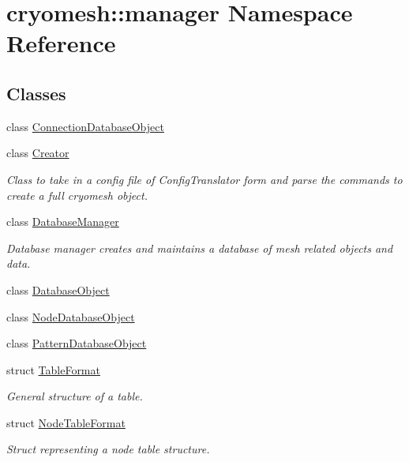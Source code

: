 \hypertarget{namespacecryomesh_1_1manager}{\section{cryomesh\-:\-:manager \-Namespace \-Reference}
\label{namespacecryomesh_1_1manager}
}
\subsection*{\-Classes}
\begin{DoxyCompactItemize}
\item 
class \hyperlink{classcryomesh_1_1manager_1_1ConnectionDatabaseObject}{\-Connection\-Database\-Object}
\item 
class \hyperlink{classcryomesh_1_1manager_1_1Creator}{\-Creator}
\begin{DoxyCompactList}\small\item\em \-Class to take in a config file of \-Config\-Translator form and parse the commands to create a full cryomesh object. \end{DoxyCompactList}\item 
class \hyperlink{classcryomesh_1_1manager_1_1DatabaseManager}{\-Database\-Manager}
\begin{DoxyCompactList}\small\item\em \-Database manager creates and maintains a database of mesh related objects and data. \end{DoxyCompactList}\item 
class \hyperlink{classcryomesh_1_1manager_1_1DatabaseObject}{\-Database\-Object}
\item 
class \hyperlink{classcryomesh_1_1manager_1_1NodeDatabaseObject}{\-Node\-Database\-Object}
\item 
class \hyperlink{classcryomesh_1_1manager_1_1PatternDatabaseObject}{\-Pattern\-Database\-Object}
\item 
struct \hyperlink{structcryomesh_1_1manager_1_1TableFormat}{\-Table\-Format}
\begin{DoxyCompactList}\small\item\em \-General structure of a table. \end{DoxyCompactList}\item 
struct \hyperlink{structcryomesh_1_1manager_1_1NodeTableFormat}{\-Node\-Table\-Format}
\begin{DoxyCompactList}\small\item\em \-Struct representing a node table structure. \end{DoxyCompactList}\item 

\end{DoxyCompactItemize}
